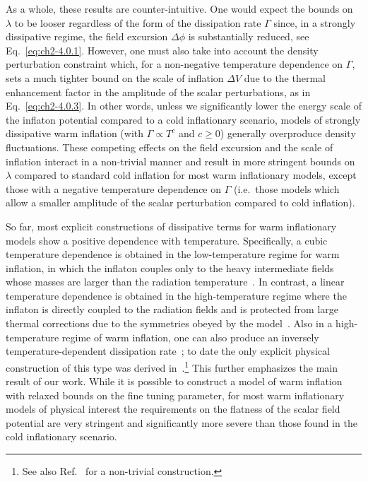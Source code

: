 As a whole, these results are counter-intuitive. One would expect the bounds on $\lambda$ to be looser regardless of the form of the dissipation rate $\Gamma$ since, in a strongly dissipative regime, the field excursion $\Delta\phi$ is substantially reduced, see Eq.~\ref{eq:ch2-4.0.1}. However, one must also take into account the density perturbation constraint which, for a non-negative temperature dependence on $\Gamma$, sets a much tighter bound on the scale of inflation $\Delta V$ due to the thermal enhancement factor in the amplitude of the scalar perturbations, as in Eq.~\ref{eq:ch2-4.0.3}. In other words, unless we significantly lower the energy scale of the inflaton potential compared to a cold inflationary scenario, models of strongly dissipative warm inflation (with $\Gamma\propto T^c$ and $c\geq 0$) generally overproduce density fluctuations. These competing effects on the field excursion and the scale of inflation interact in a non-trivial manner and result in more stringent bounds on $\lambda$ compared to standard cold inflation for most warm inflationary models, except those with a negative temperature dependence on $\Gamma$ (i.e.\ those models which allow a smaller amplitude of the scalar perturbation compared to cold inflation).

So far, most explicit constructions of dissipative terms for warm inflationary models show a positive dependence with temperature. Specifically, a cubic temperature dependence is obtained in the low-temperature regime for warm inflation, in which the inflaton couples only to the heavy intermediate fields whose masses are larger than the radiation temperature~\citep{Berera:2008ar,Bastero-Gil:2010dgy,Bastero-Gil:2012akf,Berghaus:2019whh,Motaharfar:2018zyb}. In contrast, a linear temperature dependence is obtained in the high-temperature regime where the inflaton is directly coupled to the radiation fields and is protected from large thermal corrections due to the symmetries obeyed by the model~\citep{Bastero-Gil:2016qru,Berghaus:2020ekh,Motaharfar:2018zyb}. Also in a high-temperature regime of warm inflation, one can also produce an inversely temperature-dependent dissipation rate~\citep{Berera:1998gx, Berera:1998px, Motaharfar:2018zyb}; to date the only explicit physical construction of this type was derived in~\citep{Bastero-Gil:2019gao}.\footnote{See also Ref.~\citep{Haddad:2022} for a non-trivial construction.} This further emphasizes the main result of our work. While it is possible to construct a model of warm inflation with relaxed bounds on the fine tuning parameter, for most warm inflationary models of physical interest the requirements on the flatness of the scalar field potential are very stringent and significantly more severe than those found in the cold inflationary scenario.


